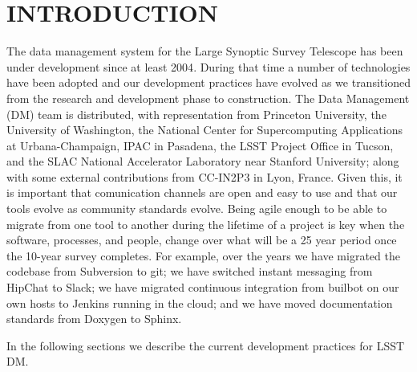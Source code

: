 \section{INTRODUCTION}

The data management system\cite{2015arXiv151207914J} for the Large Synoptic Survey Telescope\cite{2008arXiv0805.2366I} has been under development since at least 2004\cite{2004AAS...20510811A}.
During that time a number of technologies have been adopted and our development practices have evolved as we transitioned from the research and development phase to construction.
The Data Management (DM) team is distributed, with representation from Princeton University, the University of Washington, the National Center for Supercomputing Applications at Urbana-Champaign, IPAC in Pasadena, the LSST Project Office in Tucson, and the SLAC National Accelerator Laboratory near Stanford University; along with some external contributions from CC-IN2P3 in Lyon, France.
Given this, it is important that comunication channels are open and easy to use and that our tools evolve as community standards evolve.
Being agile enough to be able to migrate from one tool to another during the lifetime of a project is key when the software, processes, and people, change over what will be a 25 year period once the 10-year survey completes.
For example, over the years we have migrated the codebase from Subversion to git; we have switched instant messaging from HipChat to Slack; we have migrated continuous integration from builbot on our own hosts to Jenkins running in the cloud; and we have moved documentation standards from Doxygen to Sphinx.

In the following sections we describe the current development practices for LSST DM.
